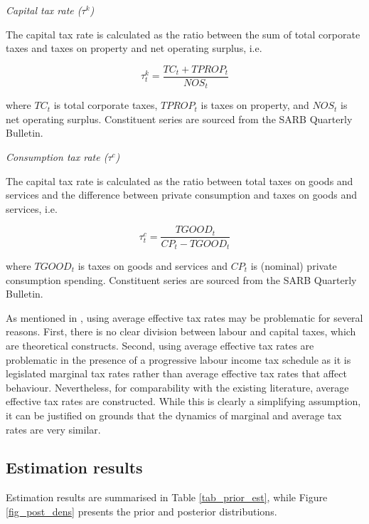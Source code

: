 \documentclass[a4paper,11pt]{article}
\numberwithin{equation}{section}
\begin{document}
	\textit{Capital tax rate ($\tau^k$)}
	
	The capital tax rate is calculated as the ratio between the sum of total corporate taxes and taxes on property and net operating surplus, i.e.
	
	\begin{equation}
	\tau^k_t = \frac{TC_t + TPROP_t}{NOS_t}
	\end{equation}
	
	where $TC_t$ is total corporate taxes, $TPROP_t$ is taxes on property, and $NOS_t$ is net operating surplus. Constituent series are sourced from the SARB Quarterly Bulletin.
	
	\textit{Consumption tax rate ($\tau^c$)}
	
	The capital tax rate is calculated as the ratio between total taxes on goods and services and the difference between private consumption and taxes on goods and services, i.e.
	
	\begin{equation}
	\tau^c_t = \frac{TGOOD_t}{CP_t-TGOOD_t}
	\end{equation}
	
	where $TGOOD_t$ is taxes on goods and services and $CP_t$ is (nominal) private consumption spending. Constituent series are sourced from the SARB Quarterly Bulletin.
	
	As mentioned in \cite{born2013}, using average effective tax rates may be problematic for several reasons. First, there is no clear division between labour and capital taxes, which are theoretical constructs. Second, using average effective tax rates are problematic in the presence of a progressive labour income tax schedule as it is legislated marginal tax rates rather than average effective tax rates that affect behaviour. Nevertheless, for comparability with the existing literature, average effective tax rates are constructed. While	this is clearly a simplifying assumption, it can be justified on grounds that the dynamics of marginal and average tax rates are very similar.
	

	
	
	\subsection{Estimation results}
	
	Estimation results are summarised in Table \ref{tab_prior_est}, while Figure \ref{fig_post_dens} presents the prior and posterior distributions. 
	
\end{document}

